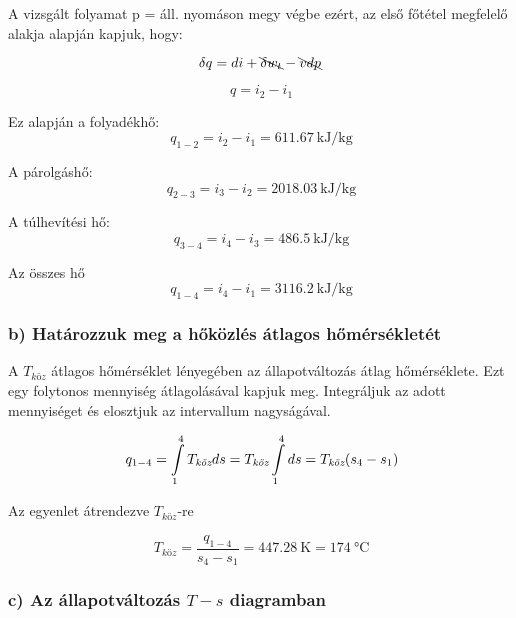 A vizsgált folyamat p = áll. nyomáson megy végbe ezért, az első főtétel megfelelő alakja alapján kapjuk, hogy:

\begin{equation}
\delta q = di + \bcancel{\delta w_t}-\bcancel{vdp}
\end{equation}

\begin{equation}
\ q = i_2-i_1
\end{equation}

Ez alapján a folyadékhő:
\begin{equation}
\ q_{1-2} = i_2-i_1 = \SI{611,67}{\kilo\joule\per\kilogram}
\end{equation}

A párolgáshő:
\begin{equation}
\ q_{2-3} = i_3-i_2 = \SI{2018,03}{\kilo\joule\per\kilogram}
\end{equation}

A túlhevítési hő:
\begin{equation}
\ q_{3-4} = i_4-i_3 = \SI{486,5}{\kilo\joule\per\kilogram}
\end{equation}

Az összes hő
\begin{equation}
\ q_{1-4} = i_4-i_1 = \SI{3116,2}{\kilo\joule\per\kilogram}
\end{equation}

\subsubsection*{b) Határozzuk meg a hőközlés átlagos hőmérsékletét}

A $T_{\textit{köz}}$ átlagos hőmérséklet lényegében az állapotváltozás átlag hőmérséklete. Ezt egy folytonos mennyiség átlagolásával kapjuk meg. Integráljuk az adott mennyiséget és elosztjuk az intervallum nagyságával. 

\begin{equation*}
\ q_{1-4} = \int\displaylimits_{1}^{4} T_{\textit{köz}} ds = T_{\textit{köz}} \int\displaylimits_{1}^{4} ds = T_{\textit{köz}} (s_4-s_1)
\end{equation*}

Az egyenlet átrendezve $T_{\textit{köz}}$-re

\begin{equation}
\ T_{\textit{köz}} = \frac{q_{1-4}}{s_4-s_1} = \SI{447,28}{\kelvin} = \SI{174}{\celsius}
\end{equation}

\subsubsection*{c) Az állapotváltozás $T-s$ diagramban}

\pagebreak
